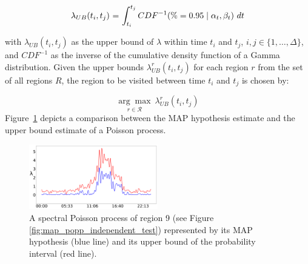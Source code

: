 \begin{equation}
	\label{eq:upper_bound_exploration}
	\begin{tabular}{r@{ = }l}
	$\lambda_{UB}(t_i, t_j)$ & $\displaystyle \int_{t_i}^{t_j} CDF^{-1}(\% = 0.95 \mid \alpha_t, \beta_t)~dt$\\ [1ex]
	\end{tabular}
\end{equation}

\noindent with $\lambda_{UB}(t_i, t_j)$ as the upper bound of $\lambda$ within time $t_i$ and $t_j$, $i, j \in \{1, \ldots, \Delta\}$, and $CDF^{-1}$ as the inverse of the cumulative density function of a Gamma distribution. Given the upper bounds $\lambda^{r}_{UB}(t_i, t_j)$ for each region $r$ from the set of all regions $R$, the region to be visited between time $t_i$ and $t_j$ is chosen by:

\begin{equation}
\label{eq:choosing_place}
\underset{r \in \mathcal R}{\arg\max}~\lambda^{r}_{UB}(t_i, t_j)
\end{equation}
\noindent Figure~\ref{fig:map_vs_ub} depicts a comparison between the MAP hypothesis estimate and the upper bound estimate of a Poisson process.

\begin{figure}[t!]
	\centering
	\includegraphics[width=0.5\textwidth]{./figures/map_vs_ub.png}
	\caption{A spectral Poisson process of region 9 (see Figure \ref{fig:map_popp_independent_test}) represented by its MAP hypothesis (blue line) and its upper bound of the probability interval (red line).}
	\label{fig:map_vs_ub}
\end{figure}

